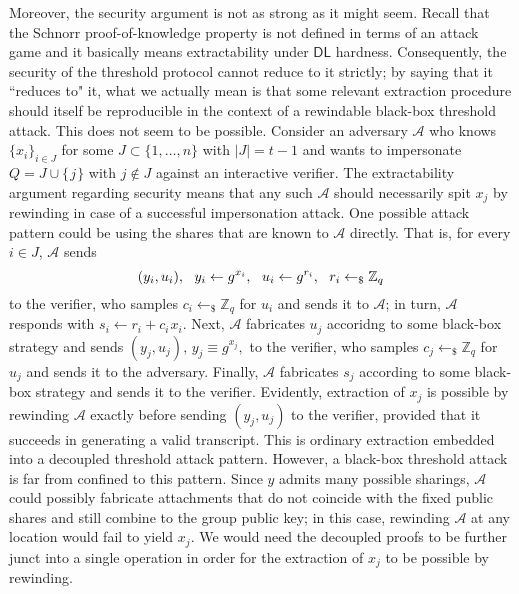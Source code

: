 \documentclass{iacrtrans}
\begin{document}
Moreover, the security argument is not as strong
as it might seem. Recall that the Schnorr proof-of-knowledge
property is not defined in terms of an attack game
and it basically means extractability under $\mathsf{DL}$
hardness. Consequently, the security of the threshold protocol
cannot reduce to it strictly;
by saying that it ``reduces to" it,
what we actually mean is that
some relevant extraction procedure
should itself be reproducible in the context of
a rewindable black-box threshold attack.
This does not seem to be possible.
Consider an adversary $\mathcal{A}$ who knows
$\{x_i\}_{i \in J}$
for some $J \subset \{1, \dots, n\}$ with $|J| = t - 1$
and wants to impersonate
$Q = J \cup \{\hspace{1pt}j\hspace{1pt}\}$
with $j \not \in J$ against an interactive verifier.
The extractability argument regarding security
means that any such $\mathcal{A}$
should necessarily spit $x_j$ by rewinding in case of
a successful impersonation attack.
One possible attack pattern could
be using the shares that are known to $\mathcal{A}$ directly.
That is, for every $i \in J$,
$\mathcal{A}$ sends
\vspace{5pt}
\begin{equation*}
(y_i, u_i),
\ \ y_i \leftarrow g ^ {x_i},
\ \ u_i \leftarrow g ^ {r_i},
\ \ r_i \leftarrow_\$ \mathbb{Z}_q
\vspace{5pt}
\end{equation*}
to the verifier,
who samples $c_i \leftarrow_\$ \mathbb{Z}_q$
for $u_i$
and sends it to $\mathcal{A}$;
in turn, $\mathcal{A}$ responds
with $s_i \leftarrow r_i + c_i\hspace{1pt}x_i$.
Next, $\mathcal{A}$ fabricates $u_j$
accoridng to some black-box strategy and sends
$(y_j, u_j),\hspace{2pt} y_j \equiv g ^ {x_j},$ to the verifier,
who samples $c_j \leftarrow_\$ \mathbb{Z}_q$ for $u_j$
and sends it to the adversary.
Finally, $\mathcal{A}$ fabricates $s_j$
according to some black-box strategy
and sends it to the verifier.
Evidently, extraction of $x_j$ is possible
by rewinding $\mathcal{A}$
exactly before sending $(y_j, u_j)$ to the verifier,
provided that it
succeeds in generating a valid transcript.
This is ordinary extraction
embedded into a decoupled threshold attack pattern.
However, a black-box threshold attack
is far from confined to this pattern.
Since $y$ admits many possible sharings,
$\mathcal{A}$ could possibly fabricate attachments
that do not coincide with the fixed public shares
and still combine to the group public key;
in this case, rewinding $\mathcal{A}$ at any location
would fail to yield $x_j$.
We would need the decoupled proofs to
be further junct into a single operation
in order for the extraction of $x_j$
to be possible by rewinding.
\end{document}
